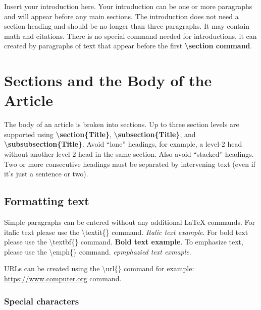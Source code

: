 \documentclass{csmagazine}
\begin{document}
\begin{flushleft}


Insert your introduction here. Your introduction can be one or more paragraphs and will appear before any main sections. The introduction does not need a section heading and should be no longer than three paragraphs. It may contain math and citations. There is no special command needed for introductions, it can created by paragraphs of text that appear before the first \textbf{\textbackslash{}section command}.

\section{Sections and the Body of the Article}

The body of an article is broken into sections. Up to three section levels are supported using \textbf{\textbackslash{}section\{Title\}}, \textbf{\textbackslash{}subsection\{Title\}}, and \textbf{\textbackslash{}subsubsection\{Title\}}. Avoid ``lone'' headings, for example, a level-2 head without another level-2 head in the same section. Also avoid ``stacked'' headings. Two or more consecutive headings must be separated by intervening text (even if it's just a sentence or two).

\subsection{Formatting text}

Simple paragraphs can be entered without any additional LaTeX commands. For italic text please use the \textbackslash{}textit\{\} command. \textit{Italic text example}. For bold text please use the \textbackslash{}textbf\{\} command. \textbf{Bold text example}. To emphasize text, please use the \textbackslash{}emph\{\} command. \emph{epmphazied text exmaple}.

URLs can be created using the \textbackslash{}url\{\} command for example: \url{https://www.computer.org} command.

\subsubsection{Special characters}


\end{flushleft}
\end{document}
